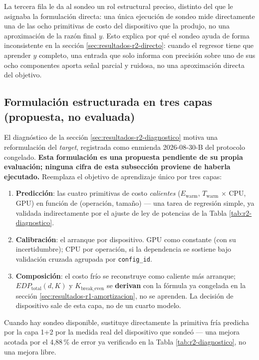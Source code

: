 \documentclass[12pt,oneside,spanish]{book}
\begin{document}
La tercera fila le da al sondeo un rol estructural preciso, distinto del que le asignaba la formulación directa: una única ejecución de sondeo mide directamente una de las ocho primitivas de costo del dispositivo que la produjo, no una aproximación de la razón final $y$. Esto explica por qué el sondeo ayuda de forma inconsistente en la sección \ref{sec:resultados-r2-directo}: cuando el regresor tiene que aprender $y$ completo, una entrada que solo informa con precisión sobre uno de sus ocho componentes aporta señal parcial y ruidosa, no una aproximación directa del objetivo.

\iffalse
\subsection{Formulación estructurada en tres capas (propuesta, no evaluada)}
\label{sec:resultados-r2-estructurada}

El diagnóstico de la sección \ref{sec:resultados-r2-diagnostico} motiva una reformulación del \textit{target}, registrada como enmienda 2026-08-30-B del protocolo congelado. \textbf{Esta formulación es una propuesta pendiente de su propia evaluación; ninguna cifra de esta subsección proviene de haberla ejecutado.} Reemplaza el objetivo de aprendizaje único por tres capas:

\begin{enumerate}
    \item \textbf{Predicción}: las cuatro primitivas de costo \textit{calientes} ($E_{\text{warm}}$, $T_{\text{warm}}$ $\times$ CPU, GPU) en función de (operación, tamaño) --- una tarea de regresión simple, ya validada indirectamente por el ajuste de ley de potencias de la Tabla \ref{tab:r2-diagnostico}.
    \item \textbf{Calibración}: el arranque por dispositivo. GPU como constante (con su incertidumbre); CPU por operación, si la dependencia se sostiene bajo validación cruzada agrupada por \texttt{config\_id}.
    \item \textbf{Composición}: el costo frío se reconstruye como caliente más arranque; $EDP_{\text{total}}(d,K)$ y $K_{\text{break\_even}}$ se \textbf{derivan} con la fórmula ya congelada en la sección \ref{sec:resultados-r1-amortizacion}, no se aprenden. La decisión de dispositivo sale de esta capa, no de un cuarto modelo.
\end{enumerate}

Cuando hay sondeo disponible, sustituye directamente la primitiva fría predicha por la capa 1+2 por la medida real del dispositivo que sondeó --- una mejora acotada por el 4,88\,\% de error ya verificado en la Tabla \ref{tab:r2-diagnostico}, no una mejora libre.
\end{document}
